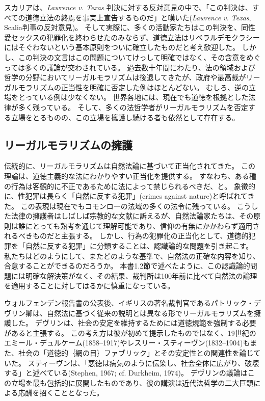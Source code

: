 \documentclass[paper=a4,book,openany]{jlreq}
\newcommand{\ig}[1]{}           %
\begin{document}
スカリアは、\emph{Lawrence v. Texas} 判決に対する反対意見の中で、「この判決は、すべての道徳立法の終焉を事実上宣告するものだ」と嘆いた(\emph{Lawrence v. Texas}, Scalia判事の反対意見)。
そして実際に、多くの活動家たちはこの判決を、同性愛セックスの犯罪化を終わらせたのみならず、道徳立法はリベラルデモクラシーにはそぐわないという基本原則をついに確立したものだと考え歓迎した。
しかし、この判決の文言はこの問題についてけっして明確ではなく、その含意をめぐっては多くの議論が交わされている。
過去数十年間にわたり、法の領域および哲学の分野においてリーガルモラリズムは後退してきたが、政府や最高裁がリーガルモラリズムの正当性を明確に否定した例はほとんどない。
むしろ、逆の立場をとっている例は少なくない。
世界各地には、現在でも道徳を根拠とした法律が多く残っている。
そして、多くの法哲学者がリーガルモラリズムを否定する立場をとるものの、この立場を擁護し続ける者も依然として存在する。

\subsection{リーガルモラリズムの擁護}

伝統的に、リーガルモラリズムは自然法論に基づいて正当化されてきた。
この理論は、道徳主義的な法にわかりやすい正当化を提供する。
すなわち、ある種の行為は客観的に不正であるために法によって禁じられるべきだ、と。
象徴的に、性犯罪は長らく「自然に反する犯罪」(crimes against nature)と呼ばれてきた。
この表現は現在でもコモンローの法域の多くの法令に残っている。
こうした法律の擁護者はしばしば宗教的な文献に訴えるが、自然法論家たちは、その原則は誰にとっても熟考を通じて理解可能であり、信仰の有無にかかわらず適用されるべきものだと主張する。
しかし、行為の犯罪化の正当化として、道徳的犯罪を「自然に反する犯罪」に分類することは、認識論的な問題を引き起こす。
私たちはどのようにして、またどのような基準で、自然法の正確な内容を知り、合意することができるのだろうか。
本書1.2節で述べたように、この認識論的問題には明確な解決策がなく、その結果、裁判所は100年前に比べて自然法の論理を適用することに対してはるかに慎重になっている。

ウォルフェンデン報告書の公表後、イギリスの著名裁判官であるパトリック・デヴリン\ig{Patrick Devlin}卿は、自然法に基づく従来の説明とは異なる形でリーガルモラリズムを擁護した。
デヴリン\ig{Patrick Devlin}は、社会の安定を維持するためには道徳規範を強制する必要があると主張する。
この考え方は彼が初めて提示したものではなく、19世紀のエミール・デュルケーム(1858--1917)やレスリー・スティーヴン(1832--1904)もまた、社会の「道徳的｛網の目｝{ファブリック}」とその安定性との関連性を論じていた。
スティーヴンは、「悪徳は病気のように伝染し、社会全体に広がり、破壊する」と述べている(Stephen, 1967; cf. Durkheim, 1974)。
\nocite{stephen67:liberty}\nocite{durkheim74:sociology}
デヴリン\ig{Patrick Devlin}の議論はこの立場を最も包括的に展開したものであり、彼の講演は近代法哲学の二大巨頭による応酬を招くこととなった。
\end{document}
